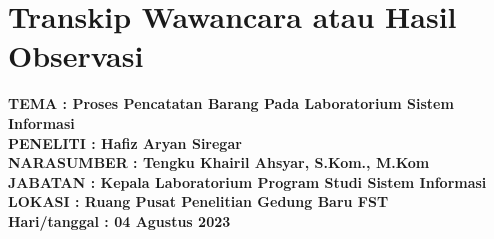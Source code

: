 %


%


\renewcommand{\thepage}{B - \arabic{page}}
\chapter{Transkip Wawancara atau Hasil Observasi}
\begin{flushleft}

  \textbf{TEMA : Proses Pencatatan Barang Pada Laboratorium Sistem Informasi} \\
  \textbf{PENELITI : Hafiz Aryan Siregar} \\
  \textbf{NARASUMBER : Tengku Khairil Ahsyar, S.Kom., M.Kom} \\
  \textbf{JABATAN : Kepala Laboratorium Program Studi Sistem Informasi} \\
  \textbf{LOKASI : Ruang Pusat Penelitian Gedung Baru FST} \\
  \textbf{Hari/tanggal : 04 Agustus 2023}
\end{flushleft}



